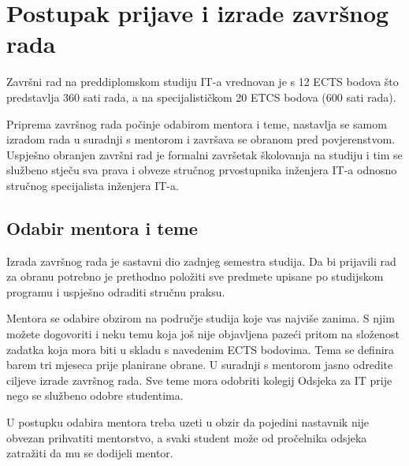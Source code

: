 \section{Postupak prijave i izrade završnog rada}
Završni rad na preddiplomskom studiju IT-a vrednovan je s 12 ECTS bodova što predstavlja 360 sati rada, a na specijalističkom 20 ETCS bodova (600 sati rada). %

Priprema završnog rada počinje odabirom mentora i teme, nastavlja se samom izradom rada u suradnji s mentorom i završava se obranom pred povjerenstvom. Uspješno obranjen završni rad je formalni završetak školovanja na studiju i tim se službeno stječu sva prava i obveze stručnog prvostupnika inženjera IT-a odnosno stručnog specijalista inženjera IT-a. 

\subsection{Odabir mentora i teme}
Izrada završnog rada je sastavni dio zadnjeg semestra studija. Da bi prijavili rad za obranu potrebno je prethodno položiti sve predmete upisane po studijskom programu i uspješno odraditi stručnu praksu. %


Mentora se odabire obzirom na područje studija koje vas najviše zanima. S njim možete dogovoriti i neku temu koja još nije objavljena pazeći pritom na složenost zadatka koja mora biti u skladu s navedenim ECTS bodovima. Tema se definira barem tri mjeseca prije planirane obrane. U suradnji s mentorom jasno odredite ciljeve izrade završnog rada. Sve teme mora odobriti kolegij Odsjeka za IT prije nego se službeno odobre studentima.

U postupku odabira mentora treba uzeti u obzir da pojedini nastavnik nije obvezan prihvatiti mentorstvo, a svaki student može od pročelnika odsjeka zatražiti da mu se dodijeli mentor.

